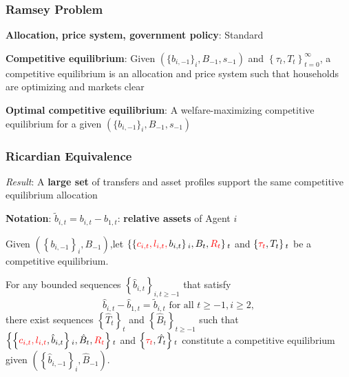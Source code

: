 \documentclass{beamer}
\begin{document}
\begin{frame}
 \frametitle{Ramsey Problem}
\label{ramsey-problem}
\begin{definition}
\textbf{Allocation, price system, government policy}: Standard

\end{definition}

\begin{definition}
\textbf{Competitive equilibrium}: Given $\left(\{b_{i,-1}\}_i,B_{-1},s_{-1}\right) $ and $\left\{ \tau _{t},T_{t}\right\} _{t=0}^{\infty }$, a competitive equilibrium is an allocation and price system such that households are optimizing and markets clear 
\end{definition}

\begin{definition}
\textbf{Optimal competitive equilibrium}: A welfare-maximizing competitive
equilibrium for a given $\left( \{b_{i,-1}\}_i,B_{-1},s_{-1}\right) $
\end{definition}
 \end{frame}



 \begin{frame}
  \frametitle{Ricardian Equivalence}
\emph{Result}: A \textbf{large set} of transfers and asset profiles support the same competitive equilibrium allocation

\textbf{Notation}: $\tilde{b}_{i,t}=b_{i,t}-b_{1,t}$: \textbf{relative assets} of Agent $i$
  \small
 \begin{theorem}
 Given $\left( \left \{ b_{i,-1}\right \} _{i},B_{-1}\right) $,let $\left \{ \left \{ \color{red}{c}_{i,t},l_{i,t},\color{black}b_{i,t}\right \} _{i},B_{t},\color{red}{R}_{t}\color{black}\right \} _{t} $ and $\left \{ \color{red}\tau _{t}\color{black},T_{t}\right\} _{t}$ be a competitive equilibrium.

 For any bounded sequences $\left \{ \hat{b}_{i,t}\right \} _{i,t\geq -1}$ that satisfy
 \begin{equation*}
 \hat{b}_{i,t}-\hat{b}_{1,t}=\tilde{b}_{i,t}\text{ for all }t\geq -1,i\geq 2,
 \end{equation*}%
 there exist  sequences $\left \{ \hat{T}_{t}\right \} _{t}$ and $%
 \left \{ \hat{B}_{t}\right \} _{t\geq -1}$ such that $\left \{ \left \{ \color{red}{c}_{i,t},l_{i,t}\color{black},\hat{b}%
 _{i,t}\right \} _{i},\hat{B}_{t},\color{red}{R}_{t}\color{black}\right \} _{t}$ and $\left \{
 \color{red}{\tau}_{t}\color{black},\hat{T}_{t}\right \} _{t}$ constitute a competitive
 equilibrium given $\left( \left \{ \hat{b}_{i,-1}\right \} _{i},\hat{B}%
 _{-1}\right) $.
 \end{theorem}
\end{frame}
\end{document}
